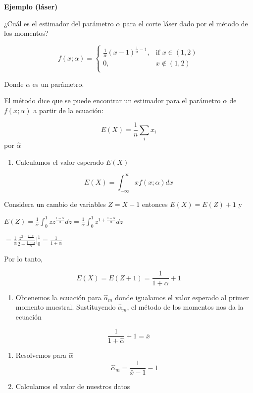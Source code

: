 \documentclass[
]{book}
\providecommand{\tightlist}{%
  \setlength{\itemsep}{0pt}\setlength{\parskip}{0pt}}
\begin{document}
\textbf{Ejemplo (láser)}

¿Cuál es el estimador del parámetro \(\alpha\) para el corte láser dado por el método de los momentos?

\[
    f(x; \alpha)= 
\begin{cases}
\frac{1}{\alpha}(x-1)^{\frac{1}{\alpha}-1},& \text{if } x \in (1,2)\\
    0,& x \notin (1,2)\\
\end{cases}
\]

Donde \(\alpha\) es un parámetro.

El método dice que se puede encontrar un estimador para el parámetro \(\alpha\) de \(f(x;\alpha)\) a partir de la ecuación:

\[E(X)=\frac{1}{n}\sum_i x_i\]
por \(\hat{\alpha}\)

\begin{enumerate}
\def\labelenumi{\arabic{enumi}.}
\tightlist
\item
  Calculamos el valor esperado \(E(X)\)
\end{enumerate}

\[E(X)=\int_{-\infty}^{\infty} xf(x;\alpha)dx\]

Considera un cambio de variables \(Z=X-1\) entonces \(E(X)=E(Z)+1\) y

\(E(Z)= \frac{1}{\alpha} \int_0^1 zz^{\frac{1-\alpha}{\alpha}}dz= \frac{1}{\alpha} \int_0^1 z^{1+\frac{1-\alpha}{\alpha}}dz\)

\(= \frac{1}{\alpha} \frac{z^{2+\frac{1-\alpha}{\alpha}}}{{2+\frac{1-\alpha}{\alpha}} } |_0^1=\frac{1}{1+\alpha}\)

Por lo tanto,

\[E(X)=E(Z+1)=\frac{1}{1+\alpha}+1\]

\begin{enumerate}
\def\labelenumi{\arabic{enumi}.}
\setcounter{enumi}{1}
\tightlist
\item
  Obtenemos la ecuación para \(\hat{\alpha}_m\) donde igualamos el valor esperado al primer momento muestral. Sustituyendo \(\hat{\alpha}_m\), el método de los momentos nos da la ecuación
\end{enumerate}

\[\frac{1}{1+\hat{\alpha}}+1=\bar{x}\]

\begin{enumerate}
\def\labelenumi{\arabic{enumi}.}
\setcounter{enumi}{2}
\item
  Resolvemos para \(\hat{\alpha}\) \[\hat{\alpha}_m=\frac{1}{\bar{x}-1}-1\]
\item
  Calculamos el valor de nuestros datos
\end{enumerate}
\end{document}
